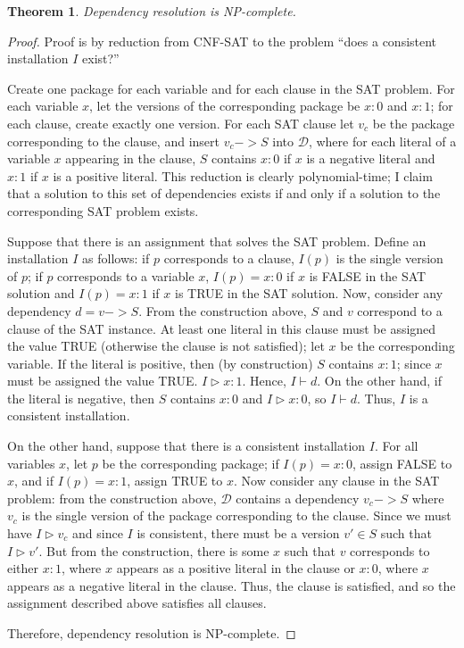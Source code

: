 \documentclass[letterpaper]{article}
\newtheorem{theorem}{Theorem}
\theoremstyle{definition}
\theoremstyle{remark}
\newcommand{\D}{\mathcal{D}}
\newcommand{\installs}{\vartriangleright}
\newcommand{\satisfies}{\vdash}
\newcommand{\col}{\mathpunct{:}}
\begin{document}
\begin{theorem}
  Dependency resolution is NP-complete.
\end{theorem}

\begin{proof}
  Proof is by reduction from CNF-SAT to the problem ``does a
  consistent installation $I$ exist?''

  Create one package for each variable and for each clause in the SAT
  problem.  For each variable $x$, let the versions of the
  corresponding package be $x \col 0$ and $x \col 1$; for each clause,
  create exactly one version.  For each SAT clause let $v_c$ be the
  package corresponding to the clause, and insert $v_c -> S$ into
  $\D$, where for each literal of a variable $x$ appearing in the
  clause, $S$ contains $x \col 0$ if $x$ is a negative literal and $x
  \col 1$ if $x$ is a positive literal.  This reduction is clearly
  polynomial-time; I claim that a solution to this set of dependencies
  exists if and only if a solution to the corresponding SAT problem
  exists.

  Suppose that there is an assignment that solves the SAT problem.
  Define an installation $I$ as follows: if $p$ corresponds to a
  clause, $I(p)$ is the single version of $p$; if $p$ corresponds to a
  variable $x$, $I(p)=x \col 0$ if $x$ is FALSE in the SAT solution
  and $I(p)=x \col 1$ if $x$ is TRUE in the SAT solution.  Now,
  consider any dependency $d=v -> S$.  From the construction above,
  $S$ and $v$ correspond to a clause of the SAT instance.  At least
  one literal in this clause must be assigned the value TRUE
  (otherwise the clause is not satisfied); let $x$ be the
  corresponding variable.  If the literal is positive, then (by
  construction) $S$ contains $x \col 1$; since $x$ must be assigned
  the value TRUE. $I \installs x \col 1$.  Hence, $I \satisfies d$.
  On the other hand, if the literal is negative, then $S$ contains $x
  \col 0$ and $I \installs x \col 0$, so $I \satisfies d$.  Thus, $I$
  is a consistent installation.

  On the other hand, suppose that there is a consistent installation
  $I$.  For all variables $x$, let $p$ be the corresponding package;
  if $I(p)=x \col 0$, assign FALSE to $x$, and if $I(p)=x \col 1$,
  assign TRUE to $x$.  Now consider any clause in the SAT problem:
  from the construction above, $\D$ contains a dependency $v_c -> S$
  where $v_c$ is the single version of the package corresponding to
  the clause.  Since we must have $I \installs v_c$ and since $I$ is
  consistent, there must be a version $v' \in S$ such that $I
  \installs v'$.  But from the construction, there is some $x$ such
  that $v$ corresponds to either $x \col 1$, where $x$ appears as a
  positive literal in the clause or $x \col 0$, where $x$ appears as a
  negative literal in the clause.  Thus, the clause is satisfied, and
  so the assignment described above satisfies all clauses.

  Therefore, dependency resolution is NP-complete.
\end{proof}
\end{document}
